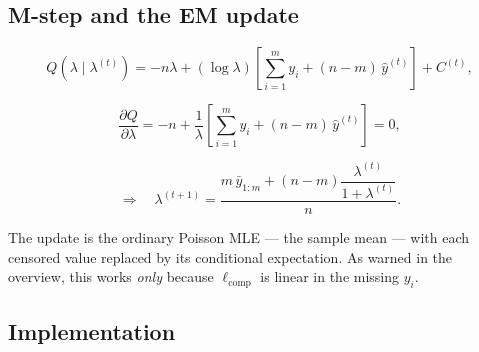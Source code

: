 \documentclass[
  letterpaper,
  DIV=11,
  numbers=noendperiod]{scrreprt}
\begin{document}
\subsection{M-step and the EM update}\label{m-step-and-the-em-update}

\[
Q\!\left(\lambda \mid \lambda^{(t)}\right)
= -n\lambda + (\log \lambda)\left[\sum_{i=1}^{m} y_i + (n - m)\,\hat y^{(t)}\right] + C^{(t)} ,
\]

\[
\frac{\partial Q}{\partial \lambda}
= -n + \frac{1}{\lambda}\left[\sum_{i=1}^{m} y_i + (n - m)\,\hat y^{(t)}\right] = 0 ,
\]

\[
\Longrightarrow \quad
\lambda^{(t+1)} = \frac{m\, \bar y_{1:m} + (n - m)\dfrac{\lambda^{(t)}}{1 + \lambda^{(t)}}}{n} .
\]

The update is the ordinary Poisson MLE --- the sample mean --- with each
censored value replaced by its conditional expectation. As warned in the
overview, this works \emph{only} because \(\ell_{\text{comp}}\) is
linear in the missing \(y_i\).

\subsection{Implementation}\label{implementation-2}
\end{document}
